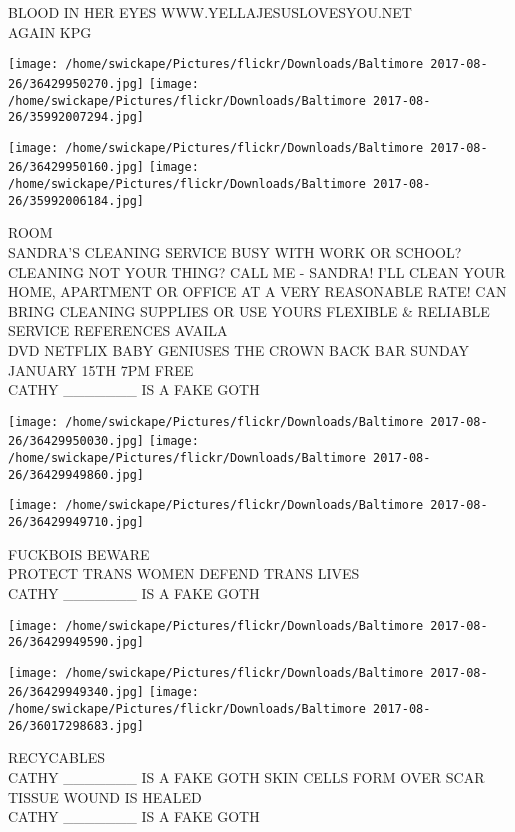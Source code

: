 \documentclass[10pt,letterpaper]{article}
\begin{document}
BLOOD IN HER EYES WWW.YELLAJESUSLOVESYOU.NET\\
AGAIN KPG
\pagebreak

\texttt{[image: /home/swickape/Pictures/flickr/Downloads/Baltimore 2017-08-26/36429950270.jpg]}
\texttt{[image: /home/swickape/Pictures/flickr/Downloads/Baltimore 2017-08-26/35992007294.jpg]}

\texttt{[image: /home/swickape/Pictures/flickr/Downloads/Baltimore 2017-08-26/36429950160.jpg]}
\texttt{[image: /home/swickape/Pictures/flickr/Downloads/Baltimore 2017-08-26/35992006184.jpg]}

ROOM\\
SANDRA'S CLEANING SERVICE BUSY WITH WORK OR SCHOOL?  CLEANING NOT YOUR THING?  CALL ME {-} SANDRA!   I'LL CLEAN YOUR HOME, APARTMENT OR OFFICE AT A VERY REASONABLE RATE!  CAN BRING CLEANING SUPPLIES OR USE YOURS FLEXIBLE \& RELIABLE SERVICE REFERENCES AVAILA\\
DVD NETFLIX BABY GENIUSES THE CROWN BACK BAR SUNDAY JANUARY 15TH 7PM FREE\\
CATHY \_\_\_\_\_\_\_ IS A FAKE GOTH
\pagebreak

\texttt{[image: /home/swickape/Pictures/flickr/Downloads/Baltimore 2017-08-26/36429950030.jpg]}
\texttt{[image: /home/swickape/Pictures/flickr/Downloads/Baltimore 2017-08-26/36429949860.jpg]}

\texttt{[image: /home/swickape/Pictures/flickr/Downloads/Baltimore 2017-08-26/36429949710.jpg]}

FUCKBOIS BEWARE\\
PROTECT TRANS WOMEN DEFEND TRANS LIVES\\
CATHY \_\_\_\_\_\_\_ IS A FAKE GOTH
\pagebreak

\texttt{[image: /home/swickape/Pictures/flickr/Downloads/Baltimore 2017-08-26/36429949590.jpg]}

\vspace{0.25in}
\texttt{[image: /home/swickape/Pictures/flickr/Downloads/Baltimore 2017-08-26/36429949340.jpg]}
\texttt{[image: /home/swickape/Pictures/flickr/Downloads/Baltimore 2017-08-26/36017298683.jpg]}

RECYCABLES\\
CATHY \_\_\_\_\_\_\_ IS A FAKE GOTH SKIN CELLS FORM OVER SCAR TISSUE WOUND IS HEALED\\
CATHY \_\_\_\_\_\_\_ IS A FAKE GOTH
\pagebreak
\end{document}
